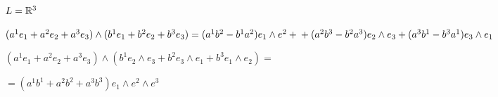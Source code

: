     \begin{illustration*}
        $L = \mathbb{R}^3$
        \par $(a^1e_1 + a^2e_2 + a^3e_3) \wedge (b^1e_1 + b^2e_2 + b^3e_3) = (a^1b^2 - b^1a^2) e_1 \wedge e^2 + \\ + (a^2b^3 - b^2a^3)e_2 \wedge e_3 + (a^3b^1 - b^3a^1)e_3 \wedge e_1$
        \par $(a^1e_1 + a^2e_2 + a^3e_3) \wedge (b^1e_2 \wedge e_3 + b^2 e_3 \wedge e_1 + b^3 e_1 \wedge e_2) =$
        \par $= (a^1b^1 + a^2b^2 + a^3b^3) e_1 \wedge e^2 \wedge e^3$
    \end{illustration*}

